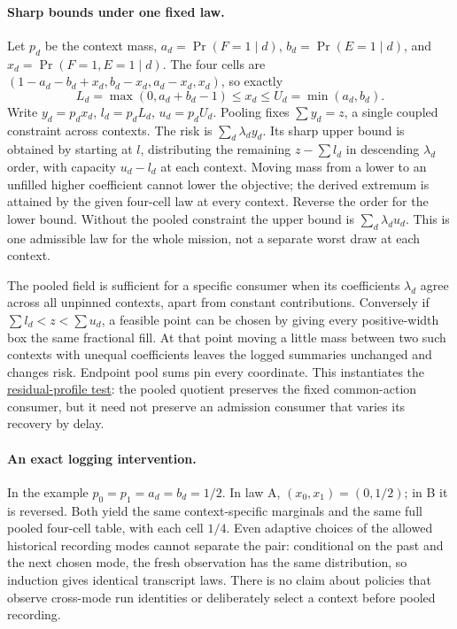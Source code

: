 \documentclass[11pt]{article}
\begin{document}
\paragraph{Sharp bounds under one fixed law.}
Let $p_d$ be the context mass, $a_d=\Pr(F=1\mid d)$, $b_d=\Pr(E=1\mid d)$, and $x_d=\Pr(F=1,E=1\mid d)$. The four cells are $(1-a_d-b_d+x_d,b_d-x_d,a_d-x_d,x_d)$, so exactly
\[
 L_d=\max(0,a_d+b_d-1)\le x_d\le U_d=\min(a_d,b_d).
\]
Write $y_d=p_dx_d$, $l_d=p_dL_d$, $u_d=p_dU_d$. Pooling fixes $\sum y_d=z$, a single coupled constraint across contexts. The risk is $\sum_d\lambda_d y_d$. Its sharp upper bound is obtained by starting at $l$, distributing the remaining $z-\sum l_d$ in descending $\lambda_d$ order, with capacity $u_d-l_d$ at each context. Moving mass from a lower to an unfilled higher coefficient cannot lower the objective; the derived extremum is attained by the given four-cell law at every context. Reverse the order for the lower bound. Without the pooled constraint the upper bound is $\sum_d\lambda_d u_d$. This is one admissible law for the whole mission, not a separate worst draw at each context.

The pooled field is sufficient for a specific consumer when its coefficients $\lambda_d$ agree across all unpinned contexts, apart from constant contributions. Conversely if $\sum l_d<z<\sum u_d$, a feasible point can be chosen by giving every positive-width box the same fractional fill. At that point moving a little mass between two such contexts with unequal coefficients leaves the logged summaries unchanged and changes risk. Endpoint pool sums pin every coordinate. This instantiates the \href{https://github.com/eternal-november/eos-research-programmes/blob/f318c0ad68b17eef1ddeabaa46f4637efc927cba/projects/contextual-composition/feedback-and-concurrency/observable-covers/Residual_Profiles_and_Admission_Reflection.tex}{residual-profile test}: the pooled quotient preserves the fixed common-action consumer, but it need not preserve an admission consumer that varies its recovery by delay.

\paragraph{An exact logging intervention.}
In the example $p_0=p_1=a_d=b_d=1/2$. In law A, $(x_0,x_1)=(0,1/2)$; in B it is reversed. Both yield the same context-specific marginals and the same full pooled four-cell table, with each cell $1/4$. Even adaptive choices of the allowed historical recording modes cannot separate the pair: conditional on the past and the next chosen mode, the fresh observation has the same distribution, so induction gives identical transcript laws. There is no claim about policies that observe cross-mode run identities or deliberately select a context before pooled recording.
\end{document}
